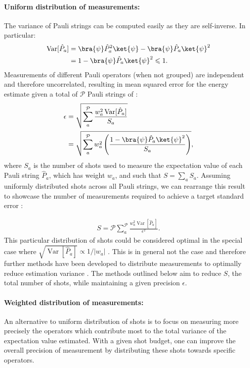 \paragraph{Uniform distribution of measurements:} The variance of  Pauli strings can be computed easily as they are self-inverse. In particular: 
\begin{align}
    \operatorname{Var}[\hat{P}_a] &= \bra{\psi}\hat{P}_a^2\ket{\psi} - \bra{\psi}\hat{P}_a\ket{\psi}^2 \nonumber \\
    &= 1 - \bra{\psi}\hat{P}_a\ket{\psi}^2 \leqslant 1.  
\end{align}
Measurements of different Pauli operators (when not grouped) are independent and therefore uncorrelated, resulting in mean squared error for the energy estimate given a total of $\mathcal{P}$ Pauli strings of \cite{Rubin2018}:
\begin{align} \label{eq:standard_error}
    \epsilon  &= \sqrt{\sum_a^{\mathcal{P}} \frac{w_a^2 \operatorname{Var}[\hat{P}_a]}{S_a}} \nonumber \\
    &= \sqrt{\sum_a^{\mathcal{P}} w_a^2 \left(\frac{1 -  \bra{\psi}\hat{P}_a\ket{\psi}^2}{S_a}\right)},
\end{align}
where $S_a$ is the number of shots used to measure the expectation value of each Pauli string $\hat{P}_a$, which has weight $w_a$, and such that $S = \sum_a S_a$. Assuming uniformly distributed shots across all Pauli strings, we can rearrange this result to showcase the number of measurements required to achieve a target standard error \cite{Arrasmith2020}: 

\begin{align} \label{eq:num_measurements_for_precision}
    S  = \mathcal{P}\sum_a^{\mathcal{P}} \frac{w_a^2 \operatorname{Var}[\hat{P}_a]}{\epsilon^2}.
\end{align}
This particular distribution of shots could be considered optimal in the special case where $\sqrt{\operatorname{Var}[\hat{P}_a]} \propto  1/|w_a|$ \cite{Rubin2018, Arrasmith2020}. This is in general not the case and therefore further methods have been developed to distribute measurements to optimally reduce estimation variance \cite{Arrasmith2020}. The methods outlined below aim to reduce $S$, the total number of shots, while maintaining a given precision $\epsilon$.

\paragraph{Weighted distribution of measurements:} An alternative to uniform distribution of shots is to focus on measuring more precisely the operators which contribute most to the total variance of the expectation value estimated. With a given shot budget, one can improve the overall precision of measurement by distributing these shots towards specific operators. 

